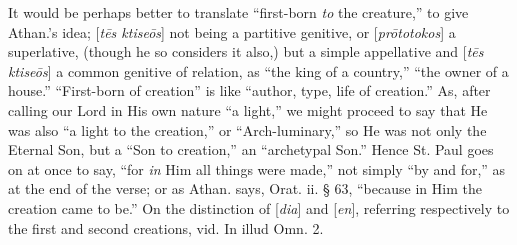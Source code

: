 It would be perhaps better to translate ``first-born
\emph{to} the creature,'' to give Athan.'s idea; [\emph{t\={e}s ktise\={o}s}]
not being a partitive genitive, or [\emph{pr\={o}totokos}] a superlative, (though he so considers it also,) but a simple
appellative and [\emph{t\={e}s ktise\={o}s}] a common genitive
of relation, as ``the king of a country,'' ``the owner of a house.'' ``First-born
of creation'' is like ``author, type, life of creation.'' As, after
calling our Lord in His own nature ``a light,'' we might proceed to say
that He was also ``a light to the creation,'' or ``Arch-luminary,'' so He
was not only the Eternal Son, but a ``Son to creation,'' an ``archetypal
Son.'' Hence St. Paul goes on at once to say, ``for \emph{in} Him all
things were made,'' not simply ``by and for,'' as at the end of the
verse; or as Athan. says, Orat. ii. § 63, ``because in Him the
creation came to be.'' On the distinction of [\emph{dia}] and [\emph{en}],
referring respectively to the first and second creations, vid. In
illud Omn. 2.

